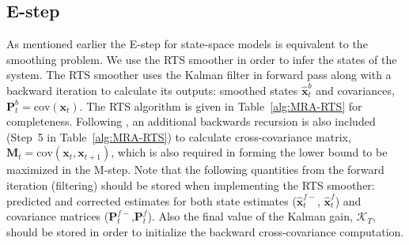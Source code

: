\documentclass[review,authoryear,3p]{elsarticle}
\begin{document}
  \subsection{E-step}
  As mentioned earlier the E-step for state-space models is equivalent to the smoothing problem. We use the RTS smoother in order to infer the states of the system. The RTS smoother uses the Kalman filter \cite{Kalman1960} in forward pass along with a backward iteration to calculate its outputs: smoothed states $\hat{\mathbf x}^b_t$ and covariances, $\mathbf P^b_t=\mathrm{cov}(\mathbf{x}_t)$. The RTS  algorithm is given in Table~\ref{alg:MRA-RTS} for completeness. Following \cite{Gibsona2005}, an additional backwards recursion is also included (Step~5 in Table~\ref{alg:MRA-RTS})	to calculate cross-covariance matrix, $\mathbf M_t=\mathrm{cov}(\mathbf{x}_{t},\mathbf{x}_{t+1})$, which is also required in forming the lower bound to be maximized in the M-step. Note that the following quantities from the forward iteration (filtering) should be stored when implementing the RTS smoother: predicted and corrected estimates for both state estimates ($\hat{\mathbf{x}}_t^{f-}$, $\hat{\mathbf{x}}_t^{f}$) and covariance matrices ($\mathbf P_t^{f-}$,$\mathbf P_t^f$). Also the final value of the Kalman gain, $\mathcal K_T$, should be stored in order to initialize the backward cross-covariance computation. 
\renewcommand{\arraystretch}{1.7}
\end{document}
